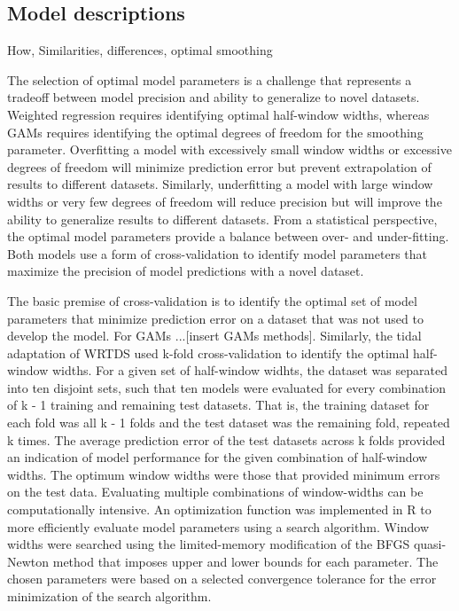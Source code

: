 \documentclass[letterpaper,12pt,oneside]{article}\usepackage[]{graphicx}\usepackage[]{color}
\begin{document}
\subsection{Model descriptions}

How, Similarities, differences, optimal smoothing

The selection of optimal model parameters is a challenge that represents a tradeoff between model precision and ability to generalize to novel datasets.  Weighted regression requires identifying optimal half-window widths, whereas \acp{GAM} requires identifying the optimal degrees of freedom for the smoothing parameter.  Overfitting a model with excessively small window widths or excessive degrees of freedom will minimize prediction error but prevent extrapolation of results to different datasets. Similarly, underfitting a model with large window widths or very few degrees of freedom will reduce precision but will improve the ability to generalize results to different datasets. From a statistical perspective, the optimal model parameters provide a balance between over- and under-fitting.  Both models use a form of cross-validation to identify model parameters that maximize the precision of model predictions with a novel dataset.   

The basic premise of cross-validation is to identify the optimal set of model parameters that minimize prediction error on a dataset that was not used to develop the model.  For \acp{GAM} \citep{Hastie90,Zuur12}...[insert GAMs methods]. Similarly, the tidal adaptation of \ac{WRTDS} used k-fold cross-validation to identify the optimal half-window widths. For a given set of half-window widhts, the dataset was separated into ten disjoint sets, such that ten models were evaluated for every combination of k - 1 training and remaining test datasets. That is, the training dataset for each fold was all k - 1 folds and the test dataset was the remaining fold, repeated k times. The average prediction error of the test datasets across k folds provided an indication of model performance for the given combination of half-window widths.  The optimum window widths were those that provided minimum errors on the test data.  Evaluating multiple combinations of window-widths can be computationally intensive. An optimization function was implemented in R  \citep{Byrd95,RDCT15} to more efficiently evaluate model parameters using a search algorithm.  Window widths were searched using the limited-memory modification of the BFGS quasi-Newton method that imposes upper and lower bounds for each parameter.  The chosen parameters were based on a selected convergence tolerance for the error minimization of the search algorithm.  
\end{document}
